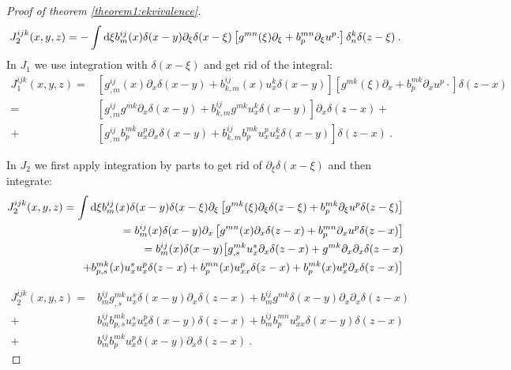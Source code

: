 \begin{proof}[Proof of theorem \ref{theorem1:ekvivalence}]
    \begin{align*}
        J_2^{ijk}(x,y,z) = - \int \mathrm{d} \xi b^{ij}_m(x) \delta(x-y) \partial_\xi \delta(x-\xi) \left[ g^{mn}(\xi) \partial_\xi + b^{mn}_p \partial_\xi u^p \cdot \right] \delta^k_n \delta(z-\xi)  \:.
    \end{align*}
    In $J_1$ we use integration with $\delta(x-\xi)$ and get rid of the integral:
    \begin{align*}
        J_1^{ijk}(x,y,z) =& \left[ g^{ij}_{,m}(x) \partial_x \delta(x-y) + b^{ij}_{k,m}(x) u^k_x \delta(x-y) \right] 
        \left[ g^{mk}(\xi) \partial_x + b^{mk}_p \partial_x u^p \cdot \right] \delta(z-x)
        \\
        =& \left[ g^{ij}_{,m} g^{mk} \partial_x \delta(x-y) + b^{ij}_{k,m} g^{mk} u^k_x \delta(x-y) \right] \partial_x \delta(z-x) + 
        \\
        +& \left[ g^{ij}_{,m} b^{mk}_p u^p_x \partial_x \delta(x-y) + b^{ij}_{k,m} b^{mk}_p u_x^p  u_x^k \delta(x-y) \right] \delta(z-x) \:.
    \end{align*}

    In $J_2$ we first apply integration by parts to get rid of $\partial_\xi \delta(x-\xi)$ and then integrate:
    \begin{align*}
        J_2^{ijk}(x,y,z) = \int \mathrm{d} \xi b^{ij}_m(x) \delta(x-y) \delta(x-\xi) \partial_\xi \left[ g^{mk}(\xi) \partial_\xi \delta(z-\xi) + b^{mk}_p \partial_\xi u^p \delta(z-\xi) \right]
        \\ = b^{ij}_m(x) \delta(x-y) \partial_x \left[ g^{mn}(x) \partial_x \delta(z-x) + b^{mn}_p \partial_x u^p \delta(z-x) \right]
        \\ = b^{ij}_m(x) \delta(x-y) \big[ g^{mk}_{,s} u^s_x \partial_x \delta (z-x) + g^{mk} \partial_x \partial_x \delta (z-x) 
        \\ + b^{mk}_{p,s}(x) u^s_x u^p_x \delta (z-x) + b^{mn}_{p}(x) u^p_{xx} \delta (z-x) + b^{mk}_{p}(x) u^p_x \partial_x \delta (z-x) \big]
    \end{align*}

    \begin{align*}
        J_2^{ijk}(x,y,z) =& b^{ij}_m g^{mk}_{,s} u^s_x \delta (x-y) \partial_x \delta (z-x) 
        + b^{ij}_m g^{mk} \delta(x-y) \partial_x \partial_x \delta (z-x) 
        \\ +& b^{ij}_m b^{mk}_{p,s} u^s_x u^p_x \delta (x-y) \delta (z-x)
        + b^{ij}_m b^{mn}_p u^p_{xx} \delta (x-y) \delta(z-x) 
        \\ +& b^{ij}_m b^{mk}_p u^p_x \delta(x-y) \partial_x \delta(z-x) \:.
    \end{align*}


\end{proof}
